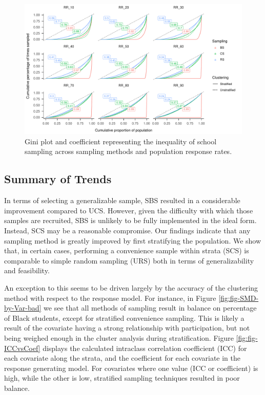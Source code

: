 \documentclass[man,floatsintext]{apa6}
\begin{document}
\begin{figure}
\includegraphics{GenSamp_Paper_files/figure-latex/fig-gini-curve-1} \caption{Gini plot and coefficient representing the inequality of school sampling across sampling methods and population response rates.}\label{fig:fig-gini-curve}
\end{figure}

\hypertarget{summary-of-trends}{%
\subsection{Summary of Trends}\label{summary-of-trends}}

In terms of selecting a generalizable sample, SBS resulted in a considerable improvement compared to UCS. However, given the difficulty with which those samples are recruited, SBS is unlikely to be fully implemented in the ideal form. Instead, SCS may be a reasonable compromise. Our findings indicate that any sampling method is greatly improved by first stratifying the population. We show that, in certain cases, performing a convenience sample within strata (SCS) is comparable to simple random sampling (URS) both in terms of generalizability and feasibility.

An exception to this seems to be driven largely by the accuracy of the clustering method with respect to the response model. For instance, in Figure \ref{fig:fig-SMD-by-Var-bad} we see that all methods of sampling result in balance on percentage of Black students, except for stratified convenience sampling. This is likely a result of the covariate having a strong relationship with participation, but not being weighed enough in the cluster analysis during stratification. Figure \ref{fig:fig-ICCvsCoef} displays the calculated intraclass correlation coefficient (ICC) for each covariate along the strata, and the coefficient for each covariate in the response generating model. For covariates where one value (ICC or coefficient) is high, while the other is low, stratified sampling techniques resulted in poor balance.
\end{document}
